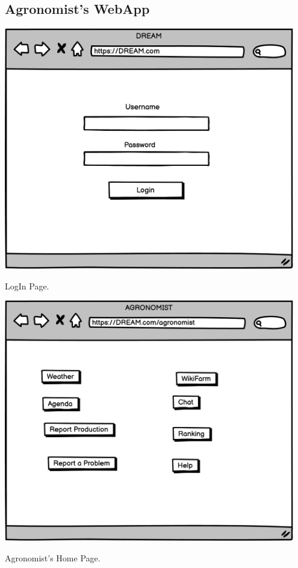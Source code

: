 \subsection{Agronomist's WebApp}
\vspace{0.5cm}
\begin{minipage}{.5\textwidth}
	\centering
	\includegraphics[width=0.95\textwidth]{Images/Mockup/Agronomist/01LoginPage.png}
	\captionsetup{type=figure}
	\caption{LogIn Page.}
\end{minipage}%
\begin{minipage}{.5\textwidth}
	\centering
	\includegraphics[width=0.95\textwidth]{Images/Mockup/Agronomist/02AgronomistHomepage.png}
	\captionsetup{type=figure}
	\caption{Agronomist's Home Page.}
\end{minipage}
